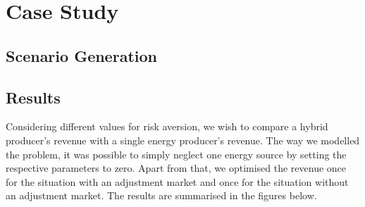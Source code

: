 \section{Case Study}

\subsection{Scenario Generation}




\subsection{Results}
Considering different values for risk aversion, we wish to compare a hybrid producer's revenue with a single energy producer's revenue. The way we modelled the problem, it was possible to simply neglect one energy source by setting the respective parameters to zero. Apart from that, we optimised the revenue once for the situation with an adjustment market and once for the situation without an adjustment market. The results are summarised in the figures below.  

